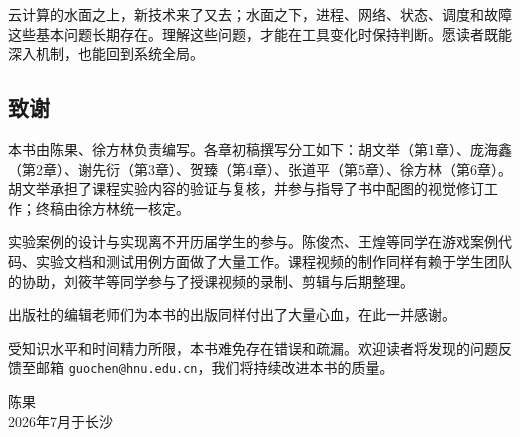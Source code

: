 云计算的水面之上，新技术来了又去；水面之下，进程、网络、状态、调度和故障这些基本问题长期存在。理解这些问题，才能在工具变化时保持判断。愿读者既能深入机制，也能回到系统全局。

\subsection*{致谢}

本书由陈果、徐方林负责编写。各章初稿撰写分工如下：胡文举（第1章）、庞海鑫（第2章）、谢先衍（第3章）、贺臻（第4章）、张道平（第5章）、徐方林（第6章）。胡文举承担了课程实验内容的验证与复核，并参与指导了书中配图的视觉修订工作；终稿由徐方林统一核定。

实验案例的设计与实现离不开历届学生的参与。陈俊杰、王煌等同学在游戏案例代码、实验文档和测试用例方面做了大量工作。课程视频的制作同样有赖于学生团队的协助，刘筱芊等同学参与了授课视频的录制、剪辑与后期整理。

出版社的编辑老师们为本书的出版同样付出了大量心血，在此一并感谢。

受知识水平和时间精力所限，本书难免存在错误和疏漏。欢迎读者将发现的问题反馈至邮箱 \texttt{guochen@hnu.edu.cn}，我们将持续改进本书的质量。

\vspace{2em}

\begin{flushright}
陈果\\
2026年7月于长沙
\end{flushright}
